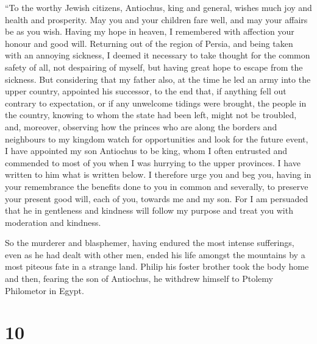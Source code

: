  ``To the worthy Jewish citizens, Antiochus, king and
general, wishes much joy and health and prosperity.  May
you and your children fare well, and may your affairs be as you wish.
Having my hope in heaven,  I remembered with affection your
honour and good will. Returning out of the region of Persia, and being
taken with an annoying sickness, I deemed it necessary to take thought
for the common safety of all,  not despairing of myself,
but having great hope to escape from the sickness.  But
considering that my father also, at the time he led an army into the
upper country, appointed his successor,  to the end that,
if anything fell out contrary to expectation, or if any unwelcome
tidings were brought, the people in the country, knowing to whom the
state had been left, might not be troubled,  and, moreover,
observing how the princes who are along the borders and neighbours to my
kingdom watch for opportunities and look for the future event, I have
appointed my son Antiochus to be king, whom I often entrusted and
commended to most of you when I was hurrying to the upper provinces. I
have written to him what is written below.  I therefore
urge you and beg you, having in your remembrance the benefits done to
you in common and severally, to preserve your present good will, each of
you, towards me and my son.  For I am persuaded that he in
gentleness and kindness will follow my purpose and treat you with
moderation and kindness.

 So the murderer and blasphemer, having endured the most
intense sufferings, even as he had dealt with other men, ended his life
amongst the mountains by a most piteous fate in a strange land.
 Philip his foster brother took the body home and then,
fearing the son of Antiochus, he withdrew himself to Ptolemy Philometor
in Egypt.

\hypertarget{section-9}{%
\section{10}\label{section-9}}


